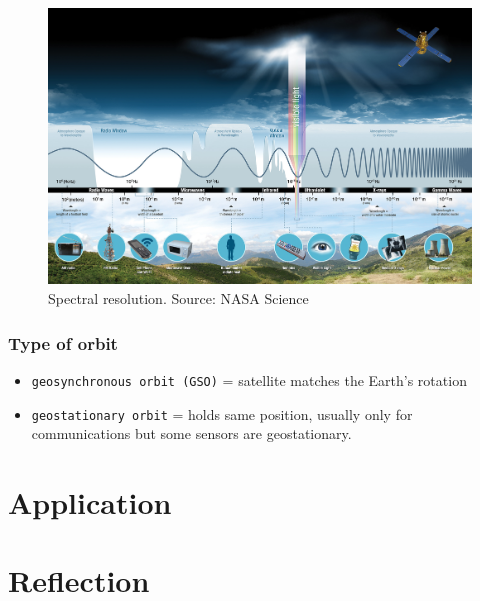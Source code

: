 \documentclass[
  letterpaper,
  DIV=11,
  numbers=noendperiod]{scrreprt}
\providecommand{\tightlist}{%
  \setlength{\itemsep}{0pt}\setlength{\parskip}{0pt}}\usepackage{longtable,booktabs,array}
\begin{document}
\begin{figure}

{\centering \includegraphics{./img/EMS-Introduction.jpg}

}

\caption{Spectral resolution. Source: NASA Science}

\end{figure}

\hypertarget{type-of-orbit}{%
\subsubsection*{\texorpdfstring{\textbf{Type of
orbit}}{Type of orbit}}\label{type-of-orbit}}

\begin{itemize}
\tightlist
\item
  \texttt{geosynchronous\ orbit\ (GSO)} = satellite matches the Earth's
  rotation
\item
  \texttt{geostationary\ orbit} = holds same position, usually only for
  communications but some sensors are geostationary.
\end{itemize}

\hypertarget{application}{%
\section*{\texorpdfstring{\textbf{Application}}{Application}}\label{application}}

\hypertarget{reflection}{%
\section*{\texorpdfstring{\textbf{Reflection}}{Reflection}}\label{reflection}}
\end{document}
